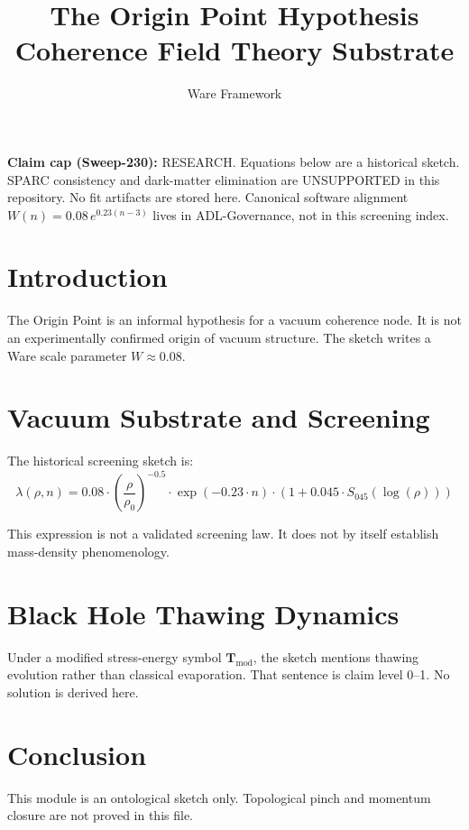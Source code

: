 \documentclass{article}
\title{The Origin Point Hypothesis \\ Coherence Field Theory Substrate}
\author{Ware Framework}
\date{}
\begin{document}
\maketitle

\noindent\textbf{Claim cap (Sweep-230):} RESEARCH. Equations below are a historical sketch.
SPARC consistency and dark-matter elimination are UNSUPPORTED in this repository.
No fit artifacts are stored here. Canonical software alignment \(W(n)=0.08\,e^{0.23(n-3)}\)
lives in ADL-Governance, not in this screening index.

\section{Introduction}
The Origin Point is an informal hypothesis for a vacuum coherence node. It is not an experimentally confirmed origin of vacuum structure. The sketch writes a Ware scale parameter \(W \approx 0.08\).

\section{Vacuum Substrate and Screening}
The historical screening sketch is:
\begin{equation}
\lambda(\rho, n) = 0.08 \cdot \left( \frac{\rho}{\rho_0} \right)^{-0.5} \cdot \exp(-0.23 \cdot n) \cdot \left(1 + 0.045 \cdot S_{045}(\log(\rho))\right)
\end{equation}

This expression is not a validated screening law. It does not by itself establish mass-density phenomenology.

\section{Black Hole Thawing Dynamics}
Under a modified stress-energy symbol \(\mathbf{T}_{\text{mod}}\), the sketch mentions thawing evolution rather than classical evaporation. That sentence is claim level 0--1. No solution is derived here.

\section{Conclusion}
This module is an ontological sketch only. Topological pinch and momentum closure are not proved in this file.
\end{document}
